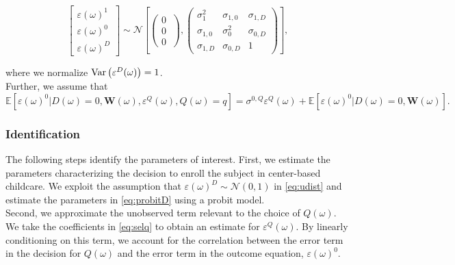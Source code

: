 \begin{appendices}
\begin{equation}
        \left[ \begin{array}{l}
        	 \varepsilon(\omega)^1 \\
            \varepsilon(\omega)^0 \\
            \varepsilon(\omega)^D
        \end{array} \right]  \sim \mathcal{N} \left[ \left( \begin{array}{l}
        	 0 \\
           0 \\ 
           0
        \end{array} \ \right), 
                \left( \begin{array}{llll}
        	 \sigma_{1}^2 & \sigma_{1,0} & \sigma_{1,D}   \\
             \sigma_{1,0} & \sigma_{0}^2 & \sigma_{0,D}   \\
             \sigma_{1,D} & \sigma_{0,D} & 1 
        \end{array} \right) \right],  \label{eq:udist}
\end{equation}

\noindent where we normalize $\operatorname{Var} \left( \varepsilon^D(\omega) \right) =1$.\\

\noindent Further, we assume that 
\begin{equation}
\mathbb{E}\left[\varepsilon(\omega)^0|D(\omega)=0,\mathbf{W}(\omega),\varepsilon^{Q}(\omega),Q(\omega)=q\right]=\sigma^{0,Q}\varepsilon^{Q}(\omega)+\mathbb{E}\left[\varepsilon(\omega)^0|D(\omega)=0,\mathbf{W}(\omega)\right].
\label{eq:E[epsilon0]}
\end{equation}

\subsubsection{Identification}

\noindent The following steps identify the parameters of interest. First, we estimate the parameters characterizing the decision to enroll the subject in center-based childcare. We exploit the assumption that $\varepsilon(\omega)^D \sim \mathcal{N} \left( 0, 1 \right)$ in \eqref{eq:udist} and estimate the parameters in \eqref{eq:probitD} using a probit model.\\

\noindent Second, we approximate the unobserved term relevant to the choice of $Q(\omega)$. We take the coefficients in \eqref{eq:selq} to obtain an estimate for $\varepsilon^{Q}(\omega)$. By linearly conditioning on this term, we account for the correlation between the error term in the decision for $Q(\omega)$ and the error term in the outcome equation, $\varepsilon(\omega)^0$.\\


\end{appendices}
